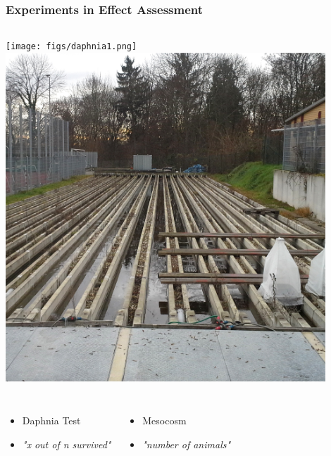 \documentclass[
	12pt
	]{beamer}
\begin{document}
{%
\begin{frame}
\frametitle{Experiments in Effect Assessment}
	\begin{columns}[T]
		\texttt{[image: figs/daphnia1.png]}
	\column<2->{.49\textwidth}
		\includegraphics[width=0.9\textwidth]{figs/mesocosm_ld.jpg}
	\end{columns}

	\vfill
	\begin{columns}[T]
		\begin{itemize}
			\item Daphnia Test
			\item \emph{"x out of n survived"}
		\end{itemize}

		\begin{itemize}
			\item Mesocosm
			\item \emph{"number of animals"}
		\end{itemize}
	\end{columns}
\end{frame}
}%
\end{document}
